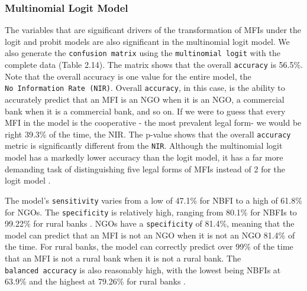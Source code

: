 \documentclass[a4paper, nobind]{templates/ociamthesis}
\begin{document}
\newpage

\hypertarget{multinomial-logit-model-1}{%
\subsubsection{Multinomial Logit Model}\label{multinomial-logit-model-1}}

The variables that are significant drivers of the transformation of MFIs under the logit and probit models are also significant in the multinomial logit model. We also generate the \texttt{confusion\ matrix} using the \texttt{multinomial\ logit} with the complete data (Table 2.14). The matrix shows that the overall \texttt{accuracy} is 56.5\%. Note that the overall accuracy is one value for the entire model, the \texttt{No\ Information\ Rate\ (NIR)}. Overall \texttt{accuracy}, in this case, is the ability to accurately predict that an MFI is an NGO when it is an NGO, a commercial bank when it is a commercial bank, and so on. If we were to guess that every MFI in the model is the cooperative - the most prevalent legal form- we would be right 39.3\% of the time, the NIR. The p-value shows that the overall \texttt{accuracy} metric is significantly different from the \texttt{NIR}. Although the multinomial logit model has a markedly lower accuracy than the logit model, it has a far more demanding task of distinguishing five legal forms of MFIs instead of 2 for the logit model \autocite{kwak2002multinomial}.

The model's \texttt{sensitivity} varies from a low of 47.1\% for NBFI to a high of 61.8\% for NGOs. The \texttt{specificity} is relatively high, ranging from 80.1\% for NBFIs to 99.22\% for rural banks \autocite{ginting2019hate}. NGOs have a \texttt{specificity} of 81.4\%, meaning that the model can predict that an MFI is not an NGO when it is not an NGO 81.4\% of the time. For rural banks, the model can correctly predict over 99\% of the time that an MFI is not a rural bank when it is not a rural bank. The \texttt{balanced\ accuracy} is also reasonably high, with the lowest being NBFIs at 63.9\% and the highest at 79.26\% for rural banks \autocite{hedeker2003mixed}.
\end{document}

